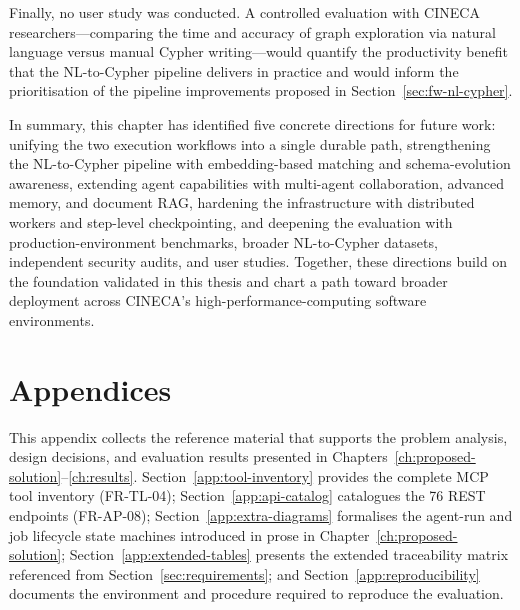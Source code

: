\documentclass[a4paper]{sapthesis}
\begin{document}
Finally, no user study was conducted.  A controlled evaluation with
CINECA researchers---comparing the time and accuracy of graph exploration
via natural language versus manual Cypher writing---would quantify the
productivity benefit that the NL-to-Cypher pipeline delivers in practice
and would inform the prioritisation of the pipeline improvements proposed
in Section~\ref{sec:fw-nl-cypher}.

\bigskip
\noindent
In summary, this chapter has identified five concrete directions for
future work: unifying the two execution workflows into a single durable
path, strengthening the NL-to-Cypher pipeline with embedding-based
matching and schema-evolution awareness, extending agent capabilities
with multi-agent collaboration, advanced memory, and document RAG,
hardening the infrastructure with distributed workers and step-level
checkpointing, and deepening the evaluation with production-environment
benchmarks, broader NL-to-Cypher datasets, independent security audits,
and user studies.  Together, these directions build on the foundation
validated in this thesis and chart a path toward broader deployment
across CINECA's high-performance-computing software environments.


\appendix

\chapter*{Appendices}
\renewcommand{\thesection}{\Alph{section}}
\setcounter{section}{0}

This appendix collects the reference material that supports the
problem analysis, design decisions, and evaluation results presented in
Chapters~\ref{ch:proposed-solution}--\ref{ch:results}.
Section~\ref{app:tool-inventory} provides the complete MCP tool
inventory (FR-TL-04); Section~\ref{app:api-catalog} catalogues the
76 REST endpoints (FR-AP-08); Section~\ref{app:extra-diagrams}
formalises the agent-run and job lifecycle state machines introduced
in prose in Chapter~\ref{ch:proposed-solution};
Section~\ref{app:extended-tables} presents the extended traceability
matrix referenced from Section~\ref{sec:requirements}; and
Section~\ref{app:reproducibility} documents the environment and
procedure required to reproduce the evaluation.
\end{document}
